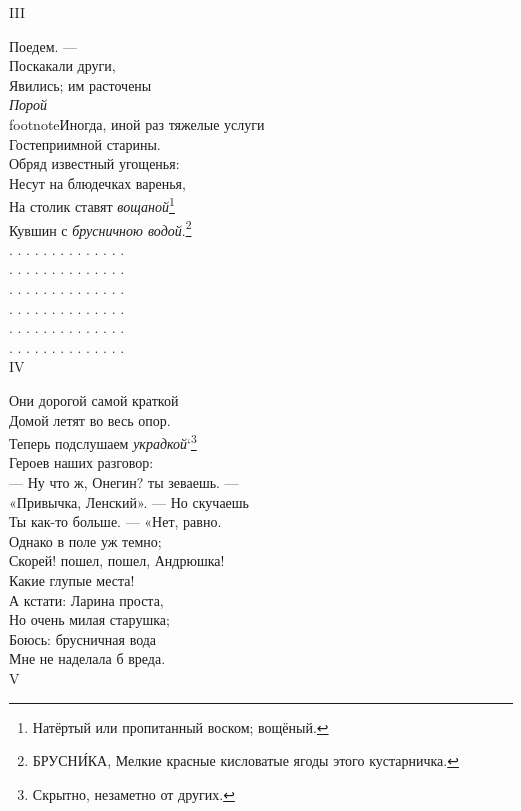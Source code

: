 III

Поедем. —\\
Поскакали други,\\
Явились; им расточены\\
\emph{Порой}\\footnote{Иногда, иной раз} тяжелые услуги\\
Гостеприимной старины.\\
Обряд известный угощенья:\\
Несут на блюдечках варенья,\\
На столик ставят \emph{вощаной}\footnote{Натёртый или пропитанный воском; вощёный.}\\
Кувшин с \emph{брусничною водой}.\footnote{БРУСНИ́КА, Мелкие красные кисловатые ягоды этого кустарничка.}\\
. . . . . . . . . . . . . .\\
. . . . . . . . . . . . . .\\
. . . . . . . . . . . . . .\\
. . . . . . . . . . . . . .\\
. . . . . . . . . . . . . .\\
. . . . . . . . . . . . . .\\

IV

Они дорогой самой краткой\\
Домой летят во весь опор.\\
Теперь подслушаем \emph{украдкой}`\footnote{Скрытно, незаметно от других.}\\
Героев наших разговор:\\
— Ну что ж, Онегин? ты зеваешь. —\\
«Привычка, Ленский». — Но скучаешь\\
Ты как-то больше. — «Нет, равно.\\
Однако в поле уж темно;\\
Скорей! пошел, пошел, Андрюшка!\\
Какие глупые места!\\
А кстати: Ларина проста,\\
Но очень милая старушка;\\
Боюсь: брусничная вода\\
Мне не наделала б вреда.\\%

V

